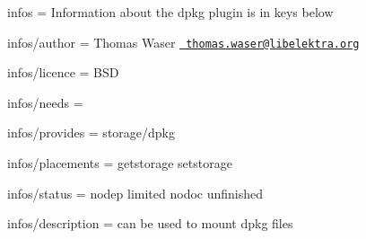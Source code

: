 
\begin{DoxyItemize}
\item infos = Information about the dpkg plugin is in keys below
\item infos/author = Thomas Waser \href{mailto:thomas.waser@libelektra.org}{\texttt{ thomas.\+waser@libelektra.\+org}}
\item infos/licence = B\+SD
\item infos/needs =
\item infos/provides = storage/dpkg
\item infos/placements = getstorage setstorage
\item infos/status = nodep limited nodoc unfinished
\item infos/description = can be used to mount dpkg files
\end{DoxyItemize}


\begin{DoxyCode}{0}
\end{DoxyCode}
 